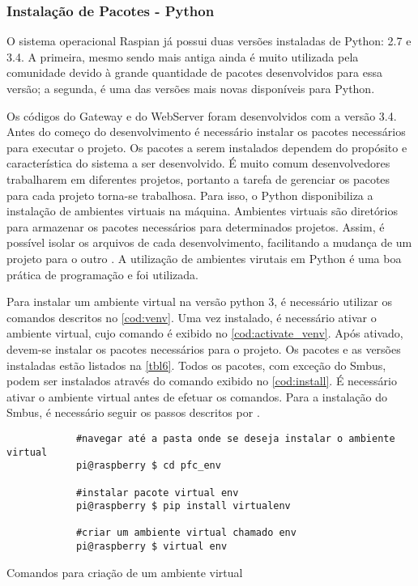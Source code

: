 		\subsubsection{Instalação de Pacotes - Python}
		O sistema operacional Raspian já possui duas versões instaladas de Python: 2.7 e 3.4. A primeira, mesmo sendo mais antiga ainda é muito utilizada pela comunidade devido à grande quantidade de pacotes desenvolvidos para essa versão; a segunda, é uma das versões mais novas disponíveis para Python.
		
		Os códigos do Gateway e do WebServer foram desenvolvidos com a versão 3.4. Antes do começo do desenvolvimento é necessário instalar os pacotes necessários para executar o projeto. Os pacotes a serem instalados dependem do propósito e característica do sistema a ser desenvolvido. É muito comum desenvolvedores trabalharem em diferentes projetos, portanto a tarefa de gerenciar os pacotes para cada projeto torna-se trabalhosa. Para isso, o Python disponibiliza a instalação de ambientes virtuais na máquina. Ambientes virtuais são diretórios para armazenar os pacotes necessários para determinados projetos. Assim, é possível isolar os arquivos de cada desenvolvimento, facilitando a mudança de um projeto para o outro \cite{kyle2017}. A utilização de ambientes virutais em Python é uma boa prática de programação e foi utilizada.
		
		Para instalar um ambiente virtual na versão python 3, é necessário utilizar os comandos descritos no \autoref{cod:venv}. Uma vez instalado, é necessário ativar o ambiente virtual, cujo comando é exibido no \autoref{cod:activate_venv}. Após ativado, devem-se instalar os pacotes necessários para o projeto. Os pacotes e as versões instaladas estão listados na \autoref{tbl6}. Todos os pacotes, com exceção do Smbus, podem ser instalados através do comando exibido no \autoref{cod:install}. É necessário ativar o ambiente virtual antes de efetuar os comandos. Para a instalação do Smbus, é necessário seguir os passos descritos por \textcite{dipto2015}.
		
		\begin{listing}[!htb]
			\begin{verbatim}
			#navegar até a pasta onde se deseja instalar o ambiente virtual
			pi@raspberry $ cd pfc_env
			
			#instalar pacote virtual env
			pi@raspberry $ pip install virtualenv
			
			#criar um ambiente virtual chamado env
			pi@raspberry $ virtual env			
			\end{verbatim}
			\caption{Comandos para criação de um ambiente virtual}
			\label{cod:venv}
		\end{listing}
		
